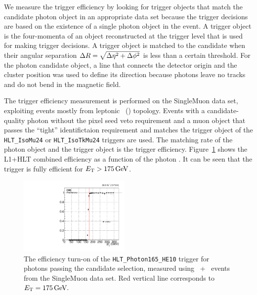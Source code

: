 We measure the trigger efficiency by looking for trigger objects that match the candidate photon object in an appropriate data set because the trigger decisions are based on the existence of a single photon object in the event.
A trigger object is the four-momenta of an object reconstructed at the trigger level that is used for making trigger decisions. 
A trigger object is matched to the candidate when their angular separation  $\Delta R = \sqrt{\Delta \eta^2 + \Delta \phi^2}$ is less than a certain threshold. 
For the photon candidate object, a line that connects the detector origin and the cluster position was used to define its direction because photons leave no tracks and do not bend in the magnetic field. 

The trigger efficiency measurement is performed on the SingleMuon data set, exploiting events mostly from leptonic \ttbar\ (\Pe\Pgm) topology. 
Events with a candidate-quality photon without the pixel seed veto requirement and a muon object that passes the ``tight'' identifictaion requirement and matches the trigger object of the \texttt{HLT\_IsoMu24} or \texttt{HLT\_IsoTkMu24} triggers are used. 
The matching rate of the photon object and the trigger object is the trigger efficiency. 
Figure~\ref{fig:hlt_eff} shows the L1+HLT combined efficiency as a function of the photon \ET. 
It can be seen that the trigger is fully efficient for $E_{\mathrm{T}} > 175\,\text{Ge\hspace{-.08em}V}$.

\begin{figure}[htbp]
  \centering
  \includegraphics[width=0.48\textwidth]{Analysis/Figures/trigger/photon_elmu_sph165abs_ptzoom.pdf}
  \caption{
    The efficiency turn-on of the \texttt{HLT\_Photon165\_HE10} trigger for photons passing the candidate selection, measured using \Pgm\ + \egamma\ events from the SingleMuon data set. 
    Red vertical line corresponds to $E_{\mathrm{T}} = 175\,\text{Ge\hspace{-.08em}V}.$
  }
  \label{fig:hlt_eff}
\end{figure}

